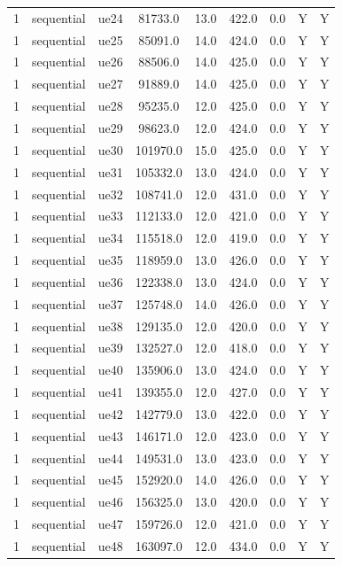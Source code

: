 \begin{table}[ht]
\begin{tabular}{|c|c|c|c|c|c|c|c|c|}
1 & sequential & ue24 & 81733.0 & 13.0 & 422.0 & 0.0 & Y & Y \\
1 & sequential & ue25 & 85091.0 & 14.0 & 424.0 & 0.0 & Y & Y \\
1 & sequential & ue26 & 88506.0 & 14.0 & 425.0 & 0.0 & Y & Y \\
1 & sequential & ue27 & 91889.0 & 14.0 & 425.0 & 0.0 & Y & Y \\
1 & sequential & ue28 & 95235.0 & 12.0 & 425.0 & 0.0 & Y & Y \\
1 & sequential & ue29 & 98623.0 & 12.0 & 424.0 & 0.0 & Y & Y \\
1 & sequential & ue30 & 101970.0 & 15.0 & 425.0 & 0.0 & Y & Y \\
1 & sequential & ue31 & 105332.0 & 13.0 & 424.0 & 0.0 & Y & Y \\
1 & sequential & ue32 & 108741.0 & 12.0 & 431.0 & 0.0 & Y & Y \\
1 & sequential & ue33 & 112133.0 & 12.0 & 421.0 & 0.0 & Y & Y \\
1 & sequential & ue34 & 115518.0 & 12.0 & 419.0 & 0.0 & Y & Y \\
1 & sequential & ue35 & 118959.0 & 13.0 & 426.0 & 0.0 & Y & Y \\
1 & sequential & ue36 & 122338.0 & 13.0 & 424.0 & 0.0 & Y & Y \\
1 & sequential & ue37 & 125748.0 & 14.0 & 426.0 & 0.0 & Y & Y \\
1 & sequential & ue38 & 129135.0 & 12.0 & 420.0 & 0.0 & Y & Y \\
1 & sequential & ue39 & 132527.0 & 12.0 & 418.0 & 0.0 & Y & Y \\
1 & sequential & ue40 & 135906.0 & 13.0 & 424.0 & 0.0 & Y & Y \\
1 & sequential & ue41 & 139355.0 & 12.0 & 427.0 & 0.0 & Y & Y \\
1 & sequential & ue42 & 142779.0 & 13.0 & 422.0 & 0.0 & Y & Y \\
1 & sequential & ue43 & 146171.0 & 12.0 & 423.0 & 0.0 & Y & Y \\
1 & sequential & ue44 & 149531.0 & 13.0 & 423.0 & 0.0 & Y & Y \\
1 & sequential & ue45 & 152920.0 & 14.0 & 426.0 & 0.0 & Y & Y \\
1 & sequential & ue46 & 156325.0 & 13.0 & 420.0 & 0.0 & Y & Y \\
1 & sequential & ue47 & 159726.0 & 12.0 & 421.0 & 0.0 & Y & Y \\
1 & sequential & ue48 & 163097.0 & 12.0 & 434.0 & 0.0 & Y & Y \\

\end{tabular}
\end{table}
